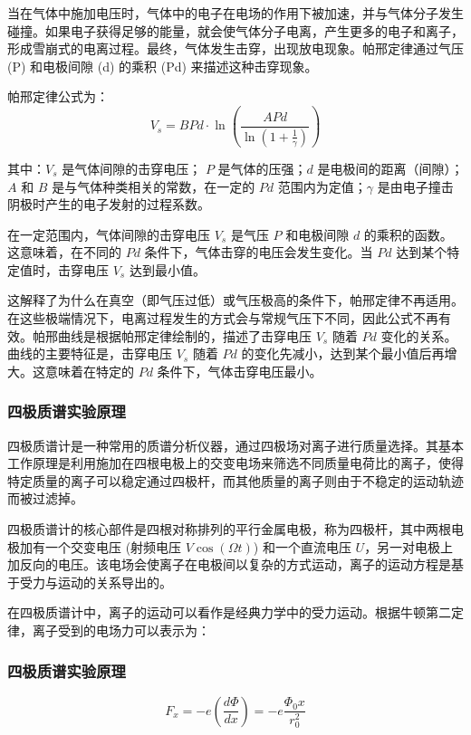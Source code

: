 \documentclass[dvipsnames, svgnames,a4paper,11pt]{article}
\begin{document}
		当在气体中施加电压时，气体中的电子在电场的作用下被加速，并与气体分子发生碰撞。如果电子获得足够的能量，就会使气体分子电离，产生更多的电子和离子，形成雪崩式的电离过程。最终，气体发生击穿，出现放电现象。帕邢定律通过气压 (P) 和电极间隙 (d) 的乘积 (Pd) 来描述这种击穿现象。
		
		帕邢定律公式为：
		\[
		V_s = B P d \cdot \ln \left( \frac{A P d}{\ln\left(1 + \frac{1}{\gamma}\right)} \right)
		\]
		
		其中：\( V_s \) 是气体间隙的击穿电压； \( P \) 是气体的压强；\( d \) 是电极间的距离（间隙）；\( A \) 和 \( B \) 是与气体种类相关的常数，在一定的 \( P d \) 范围内为定值；\( \gamma \) 是由电子撞击阴极时产生的电子发射的过程系数。
		
		在一定范围内，气体间隙的击穿电压 \( V_s \) 是气压 \( P \) 和电极间隙 \( d \) 的乘积的函数。这意味着，在不同的 \( P d \) 条件下，气体击穿的电压会发生变化。当 \( P d \) 达到某个特定值时，击穿电压 \( V_s \) 达到最小值。
		
		这解释了为什么在真空（即气压过低）或气压极高的条件下，帕邢定律不再适用。在这些极端情况下，电离过程发生的方式会与常规气压下不同，因此公式不再有效。帕邢曲线是根据帕邢定律绘制的，描述了击穿电压 \( V_s \) 随着 \( P d \) 变化的关系。曲线的主要特征是，击穿电压 \( V_s \) 随着 \( P d \) 的变化先减小，达到某个最小值后再增大。这意味着在特定的 \( P d \) 条件下，气体击穿电压最小。
		
	\subsubsection{四极质谱实验原理 }
	四极质谱计是一种常用的质谱分析仪器，通过四极场对离子进行质量选择。其基本工作原理是利用施加在四根电极上的交变电场来筛选不同质量电荷比的离子，使得特定质量的离子可以稳定通过四极杆，而其他质量的离子则由于不稳定的运动轨迹而被过滤掉。

	四极质谱计的核心部件是四根对称排列的平行金属电极，称为四极杆，其中两根电极加有一个交变电压 (射频电压 \( V \cos(\Omega t) \)) 和一个直流电压 \( U \)，另一对电极上加反向的电压。该电场会使离子在电极间以复杂的方式运动，离子的运动方程是基于受力与运动的关系导出的。

	在四极质谱计中，离子的运动可以看作是经典力学中的受力运动。根据牛顿第二定律，离子受到的电场力可以表示为：

	\subsubsection{四极质谱实验原理 }
	\[
	F_x = -e \left(\frac{d\Phi}{dx}\right) = -e \frac{\Phi_0 x}{r_0^2}
	\]
\end{document}
